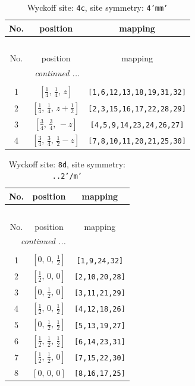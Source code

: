 \documentclass[fleqn,8pt]{jsarticle}
\begin{document}
\renewcommand{\arraystretch}{1.2}
\begin{longtable}{ccc}
\caption{Wyckoff site: {\tt 4c}, site symmetry: {\tt 4'mm'}}
 \\
 \hline \hline
No. & position & mapping \\ \hline \endfirsthead

\multicolumn{2}{l}{\tablename\ \thetable{}} \\
 \hline \hline
No. & position & mapping \\ \hline \endhead

 \hline \hline
\multicolumn{2}{r}{\footnotesize\it continued ...} \\ \endfoot

 \hline \hline
\multicolumn{2}{r}{} \\ \endlastfoot

1 & $\left[ \frac{1}{4},\, \frac{1}{4},\, z \right]$ & {\tt [1,6,12,13,18,19,31,32]} \\ \hline
2 & $\left[ \frac{1}{4},\, \frac{1}{4},\, z + \frac{1}{2} \right]$ & {\tt [2,3,15,16,17,22,28,29]} \\ \hline
3 & $\left[ \frac{3}{4},\, \frac{3}{4},\, - z \right]$ & {\tt [4,5,9,14,23,24,26,27]} \\ \hline
4 & $\left[ \frac{3}{4},\, \frac{3}{4},\, \frac{1}{2} - z \right]$ & {\tt [7,8,10,11,20,21,25,30]} \\
\end{longtable}
\renewcommand{\arraystretch}{1.2}
\begin{longtable}{ccc}
\caption{Wyckoff site: {\tt 8d}, site symmetry: {\tt ..2'/m'}}
 \\
 \hline \hline
No. & position & mapping \\ \hline \endfirsthead

\multicolumn{2}{l}{\tablename\ \thetable{}} \\
 \hline \hline
No. & position & mapping \\ \hline \endhead

 \hline \hline
\multicolumn{2}{r}{\footnotesize\it continued ...} \\ \endfoot

 \hline \hline
\multicolumn{2}{r}{} \\ \endlastfoot

1 & $\left[ 0,\, 0,\, \frac{1}{2} \right]$ & {\tt [1,9,24,32]} \\ \hline
2 & $\left[ \frac{1}{2},\, 0,\, 0 \right]$ & {\tt [2,10,20,28]} \\ \hline
3 & $\left[ 0,\, \frac{1}{2},\, 0 \right]$ & {\tt [3,11,21,29]} \\ \hline
4 & $\left[ \frac{1}{2},\, 0,\, \frac{1}{2} \right]$ & {\tt [4,12,18,26]} \\ \hline
5 & $\left[ 0,\, \frac{1}{2},\, \frac{1}{2} \right]$ & {\tt [5,13,19,27]} \\ \hline
6 & $\left[ \frac{1}{2},\, \frac{1}{2},\, \frac{1}{2} \right]$ & {\tt [6,14,23,31]} \\ \hline
7 & $\left[ \frac{1}{2},\, \frac{1}{2},\, 0 \right]$ & {\tt [7,15,22,30]} \\ \hline
8 & $\left[ 0,\, 0,\, 0 \right]$ & {\tt [8,16,17,25]} \\
\end{longtable}
\end{document}
